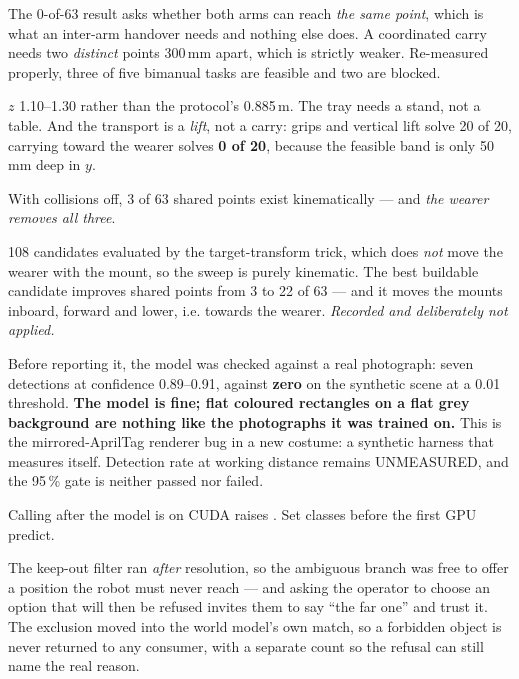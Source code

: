 {The 0-of-63 result asks whether both arms can reach \emph{the same point},
which is what an inter-arm handover needs and nothing else does. A coordinated
carry needs two \emph{distinct} points 300\,mm apart, which is strictly weaker.
Re-measured properly, three of five bimanual tasks are feasible and two are
blocked.}

{$z$ 1.10--1.30 rather than the protocol's 0.885\,m. The tray needs a stand, not
a table. And the transport is a \emph{lift}, not a carry: grips and vertical
lift solve 20 of 20, carrying toward the wearer solves \textbf{0 of 20},
because the feasible band is only 50\,mm deep in $y$.}

{With collisions off, 3 of 63 shared points exist kinematically --- and
\emph{the wearer removes all three}.}

{108 candidates evaluated by the target-transform trick, which does \emph{not}
move the wearer with the mount, so the sweep is purely kinematic. The best
buildable candidate improves shared points from 3 to 22 of 63 --- and it moves
the mounts inboard, forward and lower, i.e. towards the wearer. \textit{Recorded
and deliberately not applied.}}

{Before reporting it, the model was checked against a real photograph: seven
detections at confidence 0.89--0.91, against \textbf{zero} on the synthetic
scene at a 0.01 threshold. \textbf{The model is fine; flat coloured rectangles
on a flat grey background are nothing like the photographs it was trained on.}
This is the mirrored-AprilTag renderer bug in a new costume: a synthetic
harness that measures itself. Detection rate at working distance remains
UNMEASURED, and the 95\,\% gate is neither passed nor failed.}

{Calling  after the model is on CUDA raises
. Set classes before the
first GPU predict.}

{The keep-out filter ran \emph{after} resolution, so the ambiguous branch was
free to offer a position the robot must never reach --- and asking the operator
to choose an option that will then be refused invites them to say ``the far
one'' and trust it. The exclusion moved into the world model's own match, so a
forbidden object is never returned to any consumer, with a separate count so
the refusal can still name the real reason.}

